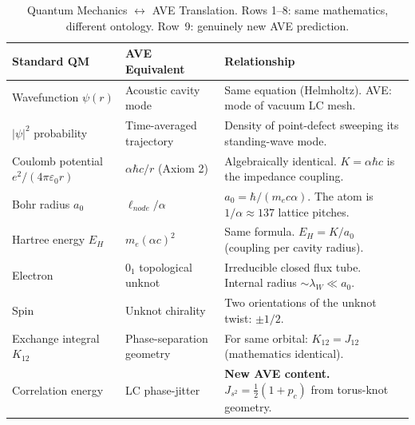 %

\begin{table}[H]
\centering
\caption{Quantum Mechanics $\leftrightarrow$ AVE Translation.  Rows 1--8: same mathematics, different ontology.  Row~9: genuinely new AVE prediction.}
\label{tab:trans_qm}
\small
\renewcommand{\arraystretch}{1.3}
\begin{tabular}{@{}p{3.2cm} p{3.5cm} p{7cm}@{}}
\toprule
\textbf{Standard QM} & \textbf{AVE Equivalent} & \textbf{Relationship} \\
\midrule
Wavefunction $\psi(r)$ & Acoustic cavity mode & Same equation (Helmholtz). AVE: mode of vacuum LC mesh. \\
$|\psi|^2$ probability & Time-averaged trajectory & Density of point-defect sweeping its standing-wave mode. \\
Coulomb potential $e^2/(4\pi\varepsilon_0 r)$ & $\alpha\hbar c / r$ (Axiom 2) & Algebraically identical. $K = \alpha\hbar c$ is the impedance coupling. \\
Bohr radius $a_0$ & $\ell_{node}/\alpha$ & $a_0 = \hbar/(m_e c \alpha)$. The atom is $1/\alpha \approx 137$ lattice pitches. \\
Hartree energy $E_H$ & $m_e(\alpha c)^2$ & Same formula. $E_H = K/a_0$ (coupling per cavity radius). \\
Electron & $0_1$ topological unknot & Irreducible closed flux tube. Internal radius $\sim \lambda_W \ll a_0$. \\
Spin & Unknot chirality & Two orientations of the unknot twist: $\pm 1/2$. \\
Exchange integral $K_{12}$ & Phase-separation geometry & For same orbital: $K_{12} = J_{12}$ (mathematics identical). \\
Correlation energy & LC phase-jitter & \textbf{New AVE content.}  $J_{s^2} = \tfrac{1}{2}(1+p_c)$ from torus-knot geometry. \\
\bottomrule
\end{tabular}
\end{table}
